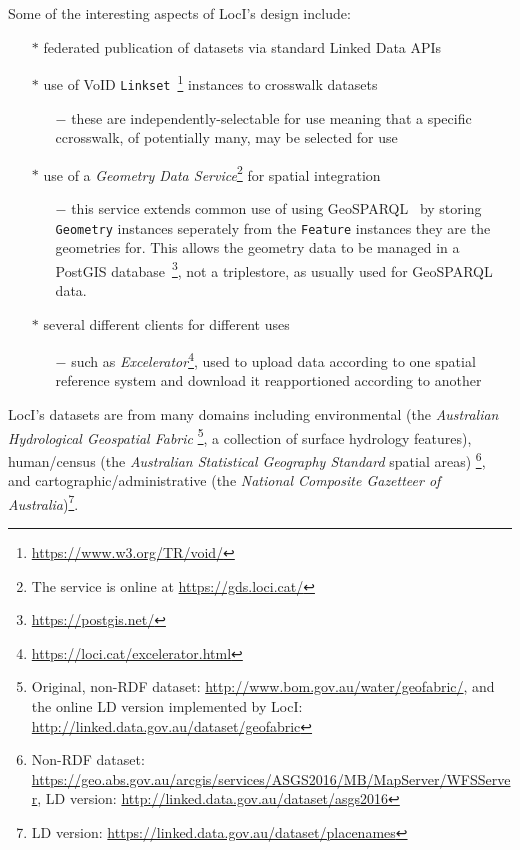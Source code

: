 \documentclass[runningheads]{llncs}
\begin{document}
Some of the interesting aspects of LocI's design include:

\begin{itemize}
    \item[$\ast$] federated publication of datasets via standard Linked Data APIs
    \item[$\ast$] use of VoID \texttt{Linkset}~\footnote{\url{https://www.w3.org/TR/void/}} instances to crosswalk datasets
    \begin{itemize}
        \item[$-$] these are independently-selectable for use meaning that a specific ccrosswalk, of potentially many, may be selected for use
    \end{itemize} 
    \item[$\ast$] use of a \textit{Geometry Data Service}\footnote{The service is online at \url{https://gds.loci.cat/}} for spatial integration
    \begin{itemize}
        \item[$-$] this service extends common use of using GeoSPARQL~\cite{open2012ogc} by storing \texttt{Geometry} instances seperately from the \texttt{Feature} instances they are the geometries for. This allows the geometry data to be managed in a PostGIS database~\footnote{\url{https://postgis.net/}}, not a triplestore, as usually used for GeoSPARQL data.
    \end{itemize}
    \item[$\ast$] several different clients for different uses
    \begin{itemize}
        \item[$-$] such as \textit{Excelerator}\footnote{\url{https://loci.cat/excelerator.html}}, used to upload data according to one spatial reference system and download it reapportioned according to another
    \end{itemize}
\end{itemize} 

LocI's datasets are from many domains including environmental (the \textit{Australian Hydrological Geospatial Fabric}
\footnote{Original, non-RDF dataset: \url{http://www.bom.gov.au/water/geofabric/}, and the online LD version implemented by LocI: \url{http://linked.data.gov.au/dataset/geofabric}}, 
a collection of surface hydrology features), human/census (the \textit{Australian Statistical Geography Standard} spatial areas)
\footnote{Non-RDF dataset: \url{https://geo.abs.gov.au/arcgis/services/ASGS2016/MB/MapServer/WFSServer}, LD version: \url{http://linked.data.gov.au/dataset/asgs2016}}, 
and cartographic/administrative (the \textit{National Composite Gazetteer of Australia})\footnote{LD version: \url{https://linked.data.gov.au/dataset/placenames}}. 
\end{document}
